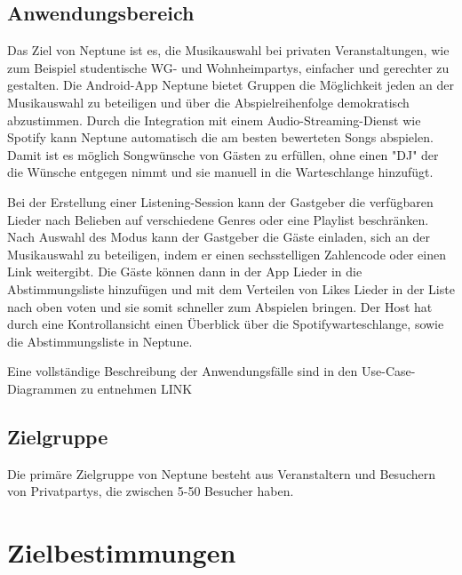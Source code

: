 \documentclass[oneside, ngerman]{sdqtechreport}
\begin{document}
\section{Anwendungsbereich}
\label{sec:Einleitung:Anwendungsbereich}

Das Ziel von Neptune ist es, die Musikauswahl bei privaten Veranstaltungen, wie zum Beispiel studentische WG- und Wohnheimpartys, einfacher und gerechter zu gestalten.
Die Android-App Neptune bietet Gruppen die Möglichkeit jeden an der Musikauswahl zu beteiligen und über die Abspielreihenfolge demokratisch abzustimmen. Durch die Integration mit einem Audio-Streaming-Dienst wie Spotify kann Neptune automatisch die am besten bewerteten Songs abspielen. Damit ist es möglich Songwünsche von Gästen zu erfüllen, ohne einen "DJ"  der die Wünsche entgegen nimmt und sie manuell in die Warteschlange hinzufügt.

Bei der Erstellung einer Listening-Session kann der Gastgeber die verfügbaren Lieder nach Belieben auf verschiedene Genres oder eine Playlist beschränken. Nach Auswahl des Modus kann der Gastgeber die Gäste einladen, sich an der Musikauswahl zu beteiligen, indem er einen sechsstelligen Zahlencode oder einen Link weitergibt. Die Gäste können dann in der App Lieder in die Abstimmungsliste hinzufügen und mit dem Verteilen von Likes Lieder in der Liste nach oben voten und sie somit schneller zum Abspielen bringen. Der Host hat durch eine Kontrollansicht einen Überblick über die Spotifywarteschlange, sowie die Abstimmungsliste in Neptune. 

Eine vollständige Beschreibung der Anwendungsfälle sind in den Use-Case-Diagrammen zu entnehmen   LINK


\section{Zielgruppe}
\label{sec:Einleitung:Zielgruppe}

Die primäre Zielgruppe von Neptune besteht aus Veranstaltern und Besuchern von Privatpartys, die zwischen 5-50 Besucher haben.  


\chapter{Zielbestimmungen}
\label{chap:Zielbestimmungen}
\end{document}
